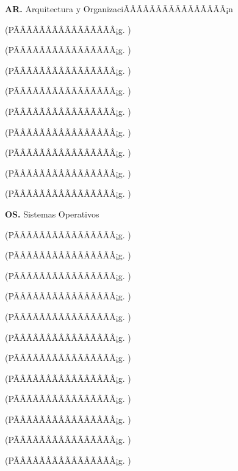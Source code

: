 	\textbf{AR.}  Arquitectura y OrganizaciÃÂÃÂÃÂÃÂÃÂÃÂÃÂÃÂ¡n%
	\begin{list}{}{%
		\setlength{\labelwidth}{0pt}%
		\setlength{\leftmargin}{15pt}}%
		\item \ARUNODef(PÃÂÃÂÃÂÃÂÃÂÃÂÃÂÃÂ¡g. \pageref{sec:BOK-AR1})
		\item \ARDOSDef(PÃÂÃÂÃÂÃÂÃÂÃÂÃÂÃÂ¡g. \pageref{sec:BOK-AR2})
		\item \ARTRESDef(PÃÂÃÂÃÂÃÂÃÂÃÂÃÂÃÂ¡g. \pageref{sec:BOK-AR3})
		\item \ARCUATRODef(PÃÂÃÂÃÂÃÂÃÂÃÂÃÂÃÂ¡g. \pageref{sec:BOK-AR4})
		\item \ARCINCODef(PÃÂÃÂÃÂÃÂÃÂÃÂÃÂÃÂ¡g. \pageref{sec:BOK-AR5})
		\item \ARSEISDef(PÃÂÃÂÃÂÃÂÃÂÃÂÃÂÃÂ¡g. \pageref{sec:BOK-AR6})
		\item \ARSIETEDef(PÃÂÃÂÃÂÃÂÃÂÃÂÃÂÃÂ¡g. \pageref{sec:BOK-AR7})
		\item \AROCHODef(PÃÂÃÂÃÂÃÂÃÂÃÂÃÂÃÂ¡g. \pageref{sec:BOK-AR8})
		\item \ARNUEVEDef(PÃÂÃÂÃÂÃÂÃÂÃÂÃÂÃÂ¡g. \pageref{sec:BOK-AR9})
	\end{list}%
	\textbf{OS.}  Sistemas Operativos%
	\begin{list}{}{%
		\setlength{\labelwidth}{0pt}%
		\setlength{\leftmargin}{15pt}}%
		\item \OSUNODef(PÃÂÃÂÃÂÃÂÃÂÃÂÃÂÃÂ¡g. \pageref{sec:BOK-OS1})
		\item \OSDOSDef(PÃÂÃÂÃÂÃÂÃÂÃÂÃÂÃÂ¡g. \pageref{sec:BOK-OS2})
		\item \OSTRESDef(PÃÂÃÂÃÂÃÂÃÂÃÂÃÂÃÂ¡g. \pageref{sec:BOK-OS3})
		\item \OSCUATRODef(PÃÂÃÂÃÂÃÂÃÂÃÂÃÂÃÂ¡g. \pageref{sec:BOK-OS4})
		\item \OSCINCODef(PÃÂÃÂÃÂÃÂÃÂÃÂÃÂÃÂ¡g. \pageref{sec:BOK-OS5})
		\item \OSSEISDef(PÃÂÃÂÃÂÃÂÃÂÃÂÃÂÃÂ¡g. \pageref{sec:BOK-OS6})
		\item \OSSIETEDef(PÃÂÃÂÃÂÃÂÃÂÃÂÃÂÃÂ¡g. \pageref{sec:BOK-OS7})
		\item \OSOCHODef(PÃÂÃÂÃÂÃÂÃÂÃÂÃÂÃÂ¡g. \pageref{sec:BOK-OS8})
		\item \OSNUEVEDef(PÃÂÃÂÃÂÃÂÃÂÃÂÃÂÃÂ¡g. \pageref{sec:BOK-OS9})
		\item \OSDIEZDef(PÃÂÃÂÃÂÃÂÃÂÃÂÃÂÃÂ¡g. \pageref{sec:BOK-OS10})
		\item \OSONCEDef(PÃÂÃÂÃÂÃÂÃÂÃÂÃÂÃÂ¡g. \pageref{sec:BOK-OS11})
		\item \OSDOCEDef(PÃÂÃÂÃÂÃÂÃÂÃÂÃÂÃÂ¡g. \pageref{sec:BOK-OS12})
	\end{list}%
